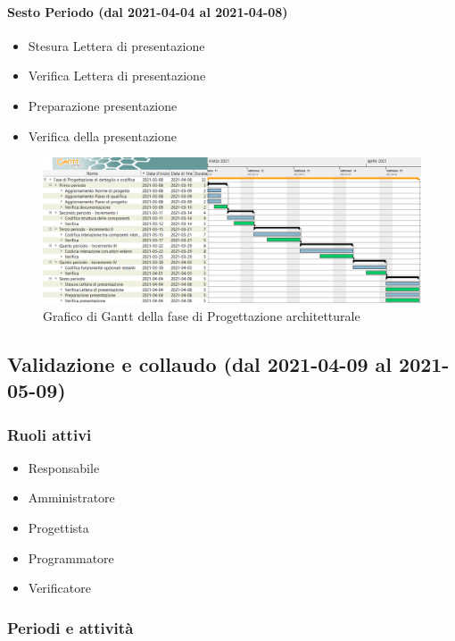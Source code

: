\paragraph{Sesto Periodo (dal 2021-04-04 al 2021-04-08)}
\begin{itemize}
	\item Stesura Lettera di presentazione
	\item Verifica Lettera di presentazione
	\item Preparazione presentazione
	\item Verifica della presentazione
\end{itemize}

\begin{landscape}
	\begin{figure}[H]
		\centering
		\includegraphics[width=\linewidth]{res/images/ganttFase3.png}
		\caption{Grafico di Gantt della fase di Progettazione architetturale}
		\label{fig:Gantt Analisi dei requisiti}
	\end{figure}
\end{landscape}

\subsection{Validazione e collaudo (dal 2021-04-09 al 2021-05-09)}

\subsubsection{Ruoli attivi}
\begin{itemize}
	\item Responsabile
	\item Amministratore
	\item Progettista
	\item Programmatore
	\item Verificatore
\end{itemize}

\subsubsection{Periodi e attività}

